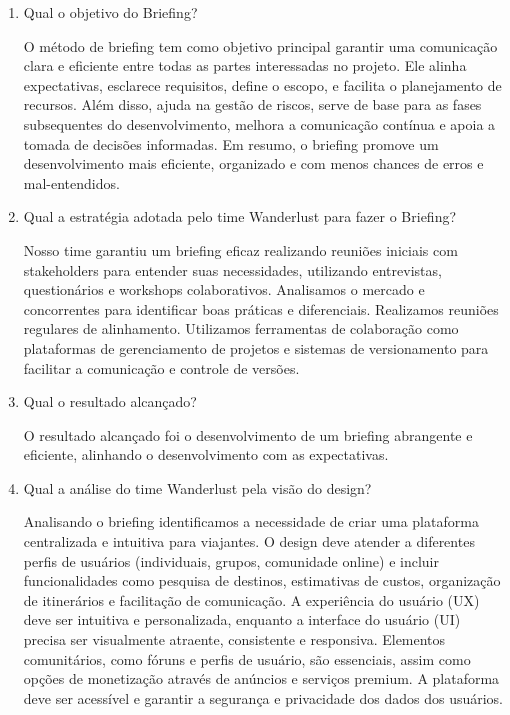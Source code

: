 \documentclass{article}
\begin{document}
\begin{enumerate}
      \item Qual o objetivo do Briefing?

            O método de briefing tem como objetivo principal garantir uma comunicação clara e eficiente entre todas as partes interessadas no projeto. Ele alinha expectativas, esclarece requisitos, define o escopo, e facilita o planejamento de recursos. Além disso, ajuda na gestão de riscos, serve de base para as fases subsequentes do desenvolvimento, melhora a comunicação contínua e apoia a tomada de decisões informadas. Em resumo, o briefing promove um desenvolvimento mais eficiente, organizado e com menos chances de erros e mal-entendidos.

      \item Qual a estratégia adotada pelo time Wanderlust para fazer o Briefing?

            Nosso time garantiu um briefing eficaz realizando reuniões iniciais com stakeholders para entender suas necessidades, utilizando entrevistas, questionários e workshops colaborativos. Analisamos o mercado e concorrentes para identificar boas práticas e diferenciais. Realizamos reuniões regulares de alinhamento. Utilizamos ferramentas de colaboração como plataformas de gerenciamento de projetos e sistemas de versionamento para facilitar a comunicação e controle de versões.

      \item Qual o resultado alcançado?

            O resultado alcançado foi o desenvolvimento de um briefing abrangente e eficiente, alinhando o desenvolvimento com as expectativas.

      \item Qual a análise do time Wanderlust pela visão do design?

            Analisando o briefing identificamos a necessidade de criar uma plataforma centralizada e intuitiva para viajantes. O design deve atender a diferentes perfis de usuários (individuais, grupos, comunidade online) e incluir funcionalidades como pesquisa de destinos, estimativas de custos, organização de itinerários e facilitação de comunicação. A experiência do usuário (UX) deve ser intuitiva e personalizada, enquanto a interface do usuário (UI) precisa ser visualmente atraente, consistente e responsiva. Elementos comunitários, como fóruns e perfis de usuário, são essenciais, assim como opções de monetização através de anúncios e serviços premium. A plataforma deve ser acessível e garantir a segurança e privacidade dos dados dos usuários.
\end{enumerate}
\end{document}
